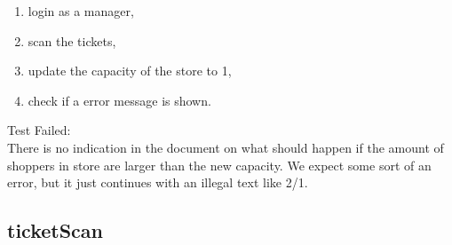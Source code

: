 \begin{itemize}
\begin{enumerate}
        \item login as a manager,

        \item scan the tickets,

        \item update the capacity of the store to 1,

        \item check if a error message is shown.
    \end{enumerate}
    Test Failed: \\
    There is no indication in the document on what should happen if the amount of shoppers in store are larger than the new capacity.
    We expect some sort of an error, but it just continues with an illegal text like 2/1.
\end{itemize}

\subsection{ticketScan}


